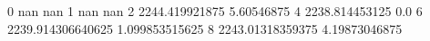 0 nan nan
1 nan nan
2 2244.419921875 5.60546875
4 2238.814453125 0.0
6 2239.914306640625 1.099853515625
8 2243.01318359375 4.19873046875
